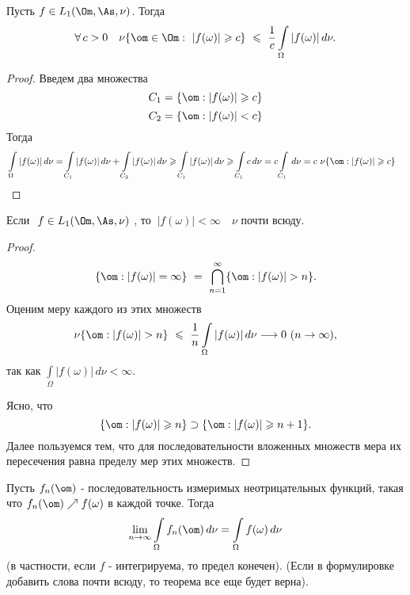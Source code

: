 \documentclass[a4paper]{article}
\newcommand{\dn}{\,d\nu}
\newcommand{\nsb}{n\rightarrow \infty} %
\newcommand{\fo}{f(\omega)}
\newcommand{\io} {\int \limits_{\Omega}}
\newcommand{\ii} {\io \fo \, d\nu}
\begin{document}
Пусть $f \in L_1(\Om, \As, \nu)$. Тогда
$$
\forall \, c >0\quad \nu \{ \om \in \Om: \ |\fo| \geqslant c\} \
\leqslant\  \frac{1}{c} \io |\fo| \dn.
$$
\begin{proof}
Введем два множества
$$
C_1 = \{\om: |\fo| \geqslant c \}
$$
$$
C_2 = \{\om: |\fo| < c \}
$$
Тогда
\begin{eqnarray*}
&\io |\fo| \dn = \int  \limits_{C_1} |\fo| \dn  + \int
\limits_{C_2} |\fo| \dn \geqslant \int  \limits_{C_1} |\fo| \dn \geqslant
 \int \limits_{C_1} c \dn = c \int \limits_{C_1} \dn = c \ \nu \{
 \om: |\fo| \geqslant c \}
\end{eqnarray*}
\end{proof}
\begin{stm}
Если $ \ f \in L_1(\Om, \As, \nu)\ $, то $\ |\fo| <
\infty \quad \nu$ почти всюду.
\end{stm}
\begin{proof}
$$
\{ \om: |\fo| = \infty \}\  = \ \bigcap \limits_{n=1}^{\infty}
\{\om : |\fo| > n \}.
$$
Оценим меру каждого из этих множеств $$ \nu \{\om:|\fo| > n \}\
\leqslant\  \frac{1}{n} \io |\fo| \dn \longrightarrow 0 \  (n
\rightarrow \infty ),$$ так как $\io |\fo| \, d\nu < \infty.$

Ясно, что
$$\{ \om: |\fo| \geqslant n \} \supset \{ \om: |\fo|
\geqslant n+1 \}.$$ Далее пользуемся тем, что для
последовательности вложенных множеств мера их пересечения равна
пределу мер этих множеств.

\end{proof}
\begin{theorem}
Пусть $f_n(\om)$ -  последовательность измеримых неотрицательных
функций, такая что $f_n(\om)\nearrow \fo$ в каждой точке. Тогда
$$
\lim \limits_{\nsb} \io f_n(\om) \dn = \ii
$$
(в частности, если $f$ - интегрируема, то предел конечен). (Если в
формулировке добавить слова почти всюду, то теорема все еще будет
верна).
\end{theorem}
\end{document}
